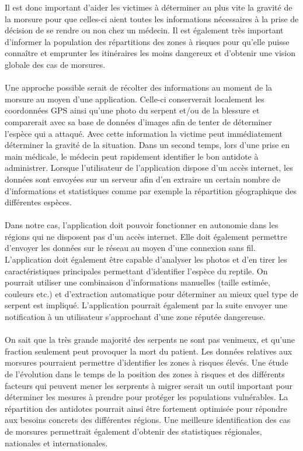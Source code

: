 \documentclass[10pt, conference, compsocconf]{llncs}
\begin{document}
Il est donc important d'aider les victimes à déterminer au plus vite la gravité de la morsure pour que celles-ci aient toutes les informations nécessaires à la prise de décision de se rendre ou non chez un médecin. Il est également très important d'informer la population des répartitions des zones à risques pour qu'elle puisse connaître et emprunter les itinéraires les moins dangereux et d'obtenir une vision globale des cas de morsures. \\
\\
Une approche possible serait de récolter des informations au moment de la morsure au moyen d'une application. Celle-ci conserverait localement les coordonnées GPS ainsi qu'une photo du serpent et/ou de la blessure et comparerait avec sa base de données d'images afin de tenter de déterminer l'espèce qui a attaqué. Avec cette information la victime peut immédiatement déterminer la gravité de la situation. Dans un second temps, lors d'une prise en main médicale, le médecin peut rapidement identifier le bon antidote à administrer. Lorsque l'utilisateur de l'application dispose d'un accès internet, les données sont envoyées sur un serveur afin d'en extraire un certain nombre de d'informations et statistiques comme par exemple la répartition géographique des différentes espèces. \\
\\
Dans notre cas, l'application doit pouvoir fonctionner en autonomie dans les régions qui ne disposent pas d'un accès internet. Elle doit également permettre d'envoyer les données sur le réseau au moyen d'une connexion sans fil. L'application doit également être capable d'analyser les photos et d'en tirer les caractéristiques principales permettant d'identifier l'espèce du reptile. On pourrait utiliser une combinaison d'informations manuelles (taille estimée, couleurs etc.) et d'extraction automatique pour déterminer au mieux quel type de serpent est impliqué. L'application pourrait également par la suite envoyer une notification à un utilisateur s'approchant d'une zone réputée dangereuse.\\
\\
On sait que la très grande majorité des serpents ne sont pas venimeux, et qu'une fraction seulement peut provoquer la mort du patient\cite{simpson_snakes_2007}. Les données relatives aux morsures pourraient permettre d'identifier les zones à risques élevés. Une étude de l'évolution dans le temps de la position des zones à risques et des différents facteurs qui peuvent mener les serprents à migrer serait un outil important pour déterminer les mesures à prendre pour protéger les populations vulnérables. La répartition des antidotes pourrait ainsi être fortement optimisée pour répondre aux besoins concrets des différentes régions. Une meilleure identification des cas de morsures permettrait également d'obtenir des statistiques régionales, nationales et internationales. \\
\end{document}
